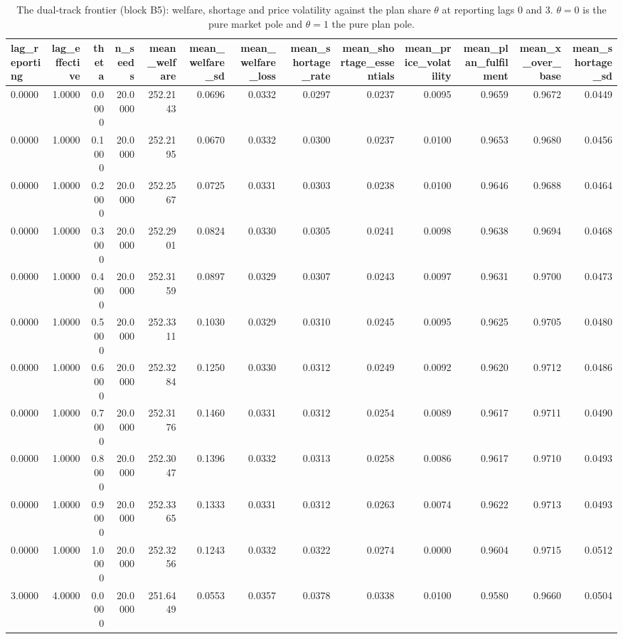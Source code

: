 \begin{table}[htbp]
\centering
\caption{The dual-track frontier (block B5): welfare, shortage and price volatility against the plan share $\theta$ at reporting lags 0 and 3. $\theta=0$ is the pure market pole and $\theta=1$ the pure plan pole.}
\label{tab:dual_track}
\begin{tabular}{lrrrrrrrrrrrr}
\toprule
lag\_reporting & lag\_effective & theta & n\_seeds & mean\_welfare & mean\_welfare\_sd & mean\_welfare\_loss & mean\_shortage\_rate & mean\_shortage\_essentials & mean\_price\_volatility & mean\_plan\_fulfilment & mean\_x\_over\_base & mean\_shortage\_sd \\
\midrule
0.0000 & 1.0000 & 0.0000 & 20.0000 & 252.2143 & 0.0696 & 0.0332 & 0.0297 & 0.0237 & 0.0095 & 0.9659 & 0.9672 & 0.0449 \\
0.0000 & 1.0000 & 0.1000 & 20.0000 & 252.2195 & 0.0670 & 0.0332 & 0.0300 & 0.0237 & 0.0100 & 0.9653 & 0.9680 & 0.0456 \\
0.0000 & 1.0000 & 0.2000 & 20.0000 & 252.2567 & 0.0725 & 0.0331 & 0.0303 & 0.0238 & 0.0100 & 0.9646 & 0.9688 & 0.0464 \\
0.0000 & 1.0000 & 0.3000 & 20.0000 & 252.2901 & 0.0824 & 0.0330 & 0.0305 & 0.0241 & 0.0098 & 0.9638 & 0.9694 & 0.0468 \\
0.0000 & 1.0000 & 0.4000 & 20.0000 & 252.3159 & 0.0897 & 0.0329 & 0.0307 & 0.0243 & 0.0097 & 0.9631 & 0.9700 & 0.0473 \\
0.0000 & 1.0000 & 0.5000 & 20.0000 & 252.3311 & 0.1030 & 0.0329 & 0.0310 & 0.0245 & 0.0095 & 0.9625 & 0.9705 & 0.0480 \\
0.0000 & 1.0000 & 0.6000 & 20.0000 & 252.3284 & 0.1250 & 0.0330 & 0.0312 & 0.0249 & 0.0092 & 0.9620 & 0.9712 & 0.0486 \\
0.0000 & 1.0000 & 0.7000 & 20.0000 & 252.3176 & 0.1460 & 0.0331 & 0.0312 & 0.0254 & 0.0089 & 0.9617 & 0.9711 & 0.0490 \\
0.0000 & 1.0000 & 0.8000 & 20.0000 & 252.3047 & 0.1396 & 0.0332 & 0.0313 & 0.0258 & 0.0086 & 0.9617 & 0.9710 & 0.0493 \\
0.0000 & 1.0000 & 0.9000 & 20.0000 & 252.3365 & 0.1333 & 0.0331 & 0.0312 & 0.0263 & 0.0074 & 0.9622 & 0.9713 & 0.0493 \\
0.0000 & 1.0000 & 1.0000 & 20.0000 & 252.3256 & 0.1243 & 0.0332 & 0.0322 & 0.0274 & 0.0000 & 0.9604 & 0.9715 & 0.0512 \\
3.0000 & 4.0000 & 0.0000 & 20.0000 & 251.6449 & 0.0553 & 0.0357 & 0.0378 & 0.0338 & 0.0100 & 0.9580 & 0.9660 & 0.0504 \\

\end{tabular}
\end{table}
